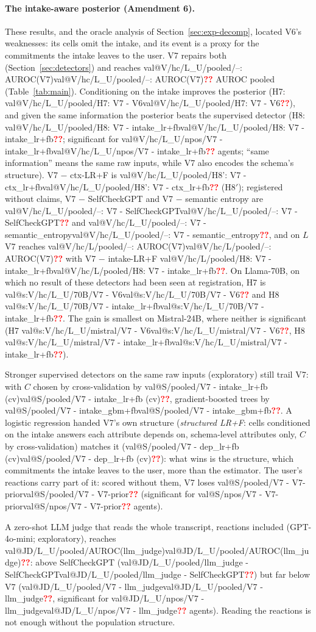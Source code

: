 \documentclass[10pt,a4paper,twocolumn]{article}
\makeatletter
\newcommand{\val}[1]{\ifcsname val@#1\endcsname\csname val@#1\endcsname\else\textcolor{red}{\textbf{??}}\fi}
\newif\iffinal \finaltrue
\newcommand{\chk}[1]{\iffinal#1\else\textcolor{blue}{#1}\fi}
\makeatother
\begin{document}
\paragraph{The intake-aware posterior (Amendment 6).} These results, and
the oracle analysis of Section~\ref{sec:exp-decomp}, located V6's
weaknesses: its cells omit the intake, and its event is a proxy for the
commitments the intake leaves to the user. V7 repairs both
(Section~\ref{sec:detectors}) and reaches
\val{V/hc/L_U/pooled/--: AUROC(V7)} AUROC pooled (Table~\ref{tab:main}).
\chk{Conditioning on the intake improves the posterior (H7:
\val{V/hc/L_U/pooled/H7: V7 - V6}), and given the same information the
posterior beats the supervised detector (H8:
\val{V/hc/L_U/pooled/H8: V7 - intake_lr+fb}; significant for
\val{V/hc/L_U/npos/V7 - intake_lr+fb} agents; ``same information'' means the
same raw inputs, while V7 also encodes the schema's structure). V7 $-$
ctx-LR+F is \val{V/hc/L_U/pooled/H8': V7 - ctx_lr+fb} (H8$'$); registered
without claims, V7 $-$ SelfCheckGPT and V7 $-$ semantic entropy are
\val{V/hc/L_U/pooled/--: V7 - SelfCheckGPT} and
\val{V/hc/L_U/pooled/--: V7 - semantic_entropy}, and on $L$ V7 reaches
\val{V/hc/L/pooled/--: AUROC(V7)} with V7 $-$ intake-LR+F
\val{V/hc/L/pooled/H8: V7 - intake_lr+fb}. On Llama-70B, on which no result of these detectors had been seen at
registration, H7 is \val{s:V/hc/L_U/70B/V7 - V6} and
H8 \val{s:V/hc/L_U/70B/V7 - intake_lr+fb}. The gain is smallest on
Mistral-24B, where neither is significant (H7 \val{s:V/hc/L_U/mistral/V7 - V6},
H8 \val{s:V/hc/L_U/mistral/V7 - intake_lr+fb}).}

\chk{Stronger supervised detectors on the same raw inputs (exploratory) still
trail V7: with $C$ chosen by cross-validation by
\val{S/pooled/V7 - intake_lr+fb (cv)}, gradient-boosted trees by
\val{S/pooled/V7 - intake_gbm+fb}. A logistic regression handed V7's own
structure (\emph{structured LR+F}: cells conditioned on the intake answers each attribute depends
on, schema-level attributes only, $C$ by cross-validation) matches it
(\val{S/pooled/V7 - dep_lr+fb (cv)}): what wins is the structure, which
commitments the intake leaves to the user, more than the estimator. The
user's reactions carry part of it: scored without them, V7 loses
\val{S/pooled/V7 - V7-prior} (significant for
\val{S/npos/V7 - V7-prior} agents).}

\chk{A zero-shot LLM judge that reads the whole transcript, reactions
included (GPT-4o-mini; exploratory), reaches
\val{JD/L_U/pooled/AUROC(llm_judge)}: above SelfCheckGPT
(\val{JD/L_U/pooled/llm_judge - SelfCheckGPT}) but far below V7
(\val{JD/L_U/pooled/V7 - llm_judge}, significant for
\val{JD/L_U/npos/V7 - llm_judge} agents). Reading the reactions is not
enough without the population structure.}
\end{document}
